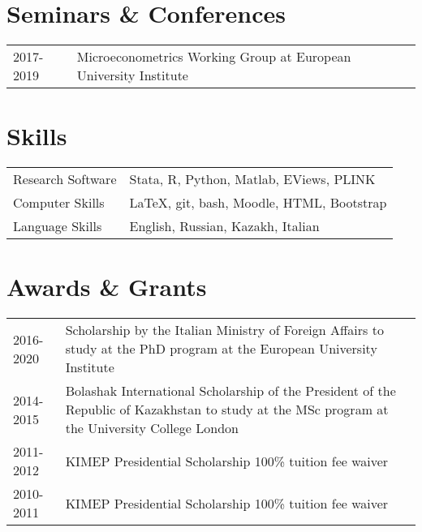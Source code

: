 \documentclass{article}
\begin{document}
    \section*{Seminars \& Conferences}
  \begin{table}[H]
      \begin{tabular}{p{2cm}p{14cm}}
          2017-2019 & {Microeconometrics Working Group} at {European University Institute}\\
      \end{tabular}
    \end{table}


    \section*{Skills}\begin{table}[H]
    \begin{tabular}{p{2cm}p{14cm}}
        Research Software & Stata, R, Python, Matlab, EViews, PLINK \\
        Computer Skills & LaTeX, git, bash, Moodle, HTML, Bootstrap \\
        Language Skills & English, Russian, Kazakh, Italian \\
    \end{tabular}
  \end{table}


    \section*{Awards \& Grants}
  \begin{table}[H]
      \begin{tabular}{p{2cm}p{14cm}}
          2016-2020 & {Scholarship by the Italian Ministry of Foreign Affairs}{} to study at the PhD program at the European University Institute\\
          2014-2015 & {Bolashak International Scholarship of the President of the Republic of Kazakhstan}{} to study at the MSc program at the University College London\\
          2011-2012 & {KIMEP Presidential Scholarship}{} 100\% tuition fee waiver\\
          2010-2011 & {KIMEP Presidential Scholarship}{} 100\% tuition fee waiver\\
      \end{tabular}
    \end{table}

    
\end{document}
